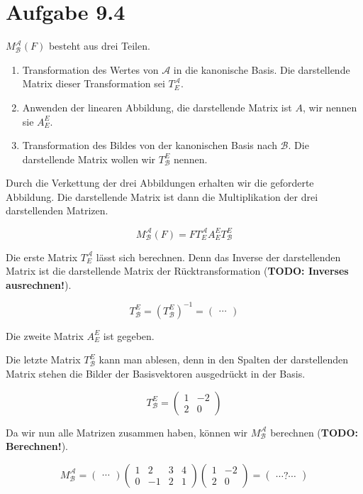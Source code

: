 \documentclass[a4paper,german,12pt,smallheadings]{scrartcl}
\begin{document}
\section*{Aufgabe 9.4}
$M^{\mathcal{A}}_{\mathcal{B}}(F)$ besteht aus drei Teilen.
\begin{enumerate}
  \item Transformation des Wertes von $\mathcal{A}$ in die kanonische Basis. Die darstellende Matrix dieser Transformation sei $T^{\mathcal{A}}_E$.
  \item Anwenden der linearen Abbildung, die darstellende Matrix ist $A$, wir nennen sie $A^E_E$.
  \item Transformation des Bildes von der kanonischen Basis nach $\mathcal{B}$. Die darstellende Matrix wollen wir $T^{E}_{\mathcal{B}}$ nennen.
\end{enumerate}

Durch die Verkettung der drei Abbildungen erhalten wir die
geforderte Abbildung. Die darstellende Matrix ist dann die Multiplikation der drei darstellenden Matrizen.

\begin{equation}
  M^{\mathcal{A}}_{\mathcal{B}}(F) = F T^{\mathcal{A}}_E A^E_E T^{E}_{\mathcal{B}}
\end{equation}


Die erste Matrix $T^{\mathcal{A}}_E$ lässt sich berechnen. Denn das Inverse der
darstellenden Matrix ist die darstellende Matrix der Rücktransformation
(\textbf{TODO: Inverses ausrechnen!}).

\begin{equation}
  T^{E}_{\mathcal{B}} = (T^{E}_{\mathcal{B}})^{-1} = \begin{pmatrix} \dotsb \end{pmatrix}
\end{equation}

Die zweite Matrix $A^E_E$ ist gegeben.

Die letzte Matrix $T^{E}_{\mathcal{B}}$ kann man ablesen, denn in
den Spalten der darstellenden Matrix stehen die Bilder der Basisvektoren
ausgedrückt in der Basis.

\begin{equation}
  T^{E}_{\mathcal{B}} = \begin{pmatrix} 1 & -2 \\ 2 & 0 \end{pmatrix}
\end{equation}

Da wir nun alle Matrizen zusammen haben, können wir
$M^{\mathcal{A}}_{\mathcal{B}}$ berechnen (\textbf{TODO: Berechnen!}).

\begin{equation}
  M^{\mathcal{A}}_{\mathcal{B}} =
\begin{pmatrix}
  \dotsb
\end{pmatrix}
\begin{pmatrix}
  1 &  2 & 3 & 4 \\
  0 & -1 & 2 & 1
\end{pmatrix}
\begin{pmatrix}
  1 & -2 \\
  2 & 0
\end{pmatrix}
=
\begin{pmatrix}
  \dotsb?\dotsb
\end{pmatrix}
\end{equation}
\end{document}
